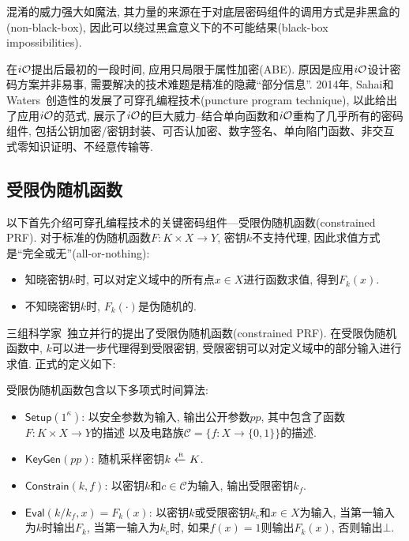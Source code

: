\begin{remark}
混淆的威力强大如魔法, 其力量的来源在于对底层密码组件的调用方式是非黑盒的(non-black-box), 因此可以绕过黑盒意义下的不可能结果(black-box impossibilities). 
\end{remark}

在$i\mathcal{O}$提出后最初的一段时间, 应用只局限于属性加密(ABE). 
原因是应用$i\mathcal{O}$设计密码方案并非易事, 需要解决的技术难题是精准的隐藏``部分信息''. 
2014年, Sahai和Waters~\cite{SW-STOC-2014}创造性的发展了可穿孔编程技术(puncture program technique), 
以此给出了应用$i\mathcal{O}$的范式, 展示了$i\mathcal{O}$的巨大威力--结合单向函数和$i\mathcal{O}$重构了几乎所有的密码组件, 
包括公钥加密/密钥封装、可否认加密、数字签名、单向陷门函数、非交互式零知识证明、不经意传输等.

\subsection{受限伪随机函数}
以下首先介绍可穿孔编程技术的关键密码组件---受限伪随机函数(constrained PRF). 
对于标准的伪随机函数$F: K \times X \rightarrow Y$, 密钥$k$不支持代理, 因此求值方式是``完全或无''(all-or-nothing):
\begin{itemize}
    \item 知晓密钥$k$时, 可以对定义域中的所有点$x \in X$进行函数求值, 得到$F_k(x)$.
    \item 不知晓密钥$k$时, $F_k(\cdot)$是伪随机的. 
\end{itemize}

三组科学家~\cite{BW-ASIACRYPT-2013, KPTZ-CCS-2013, BGI-PKC-2014}独立并行的提出了受限伪随机函数(constrained PRF). 
在受限伪随机函数中, $k$可以进一步代理得到受限密钥, 受限密钥可以对定义域中的部分输入进行求值. 正式的定义如下: 
\begin{definition} 
受限伪随机函数包含以下多项式时间算法: 
\begin{itemize}
\item $\mathsf{Setup}(1^\kappa)$: 以安全参数为输入, 输出公开参数$pp$, 其中包含了函数$F: K \times X \rightarrow Y$的描述
    以及电路族$\mathcal{C} = \{f: X \rightarrow \{0,1\}\}$的描述. 

\item $\mathsf{KeyGen}(pp)$: 随机采样密钥$k \xleftarrow{\textup{\tiny R}} K$. 

\item $\mathsf{Constrain}(k, f)$: 以密钥$k$和$c \in \mathcal{C}$为输入, 输出受限密钥$k_f$. 

\item $\mathsf{Eval}(k/k_f, x) = F_k(x)$: 以密钥$k$或受限密钥$k_c$和$x \in X$为输入, 当第一输入为$k$时输出$F_k$, 
    当第一输入为$k_c$时, 如果$f(x)=1$则输出$F_k(x)$, 否则输出$\bot$. 
\end{itemize}
\end{definition}

